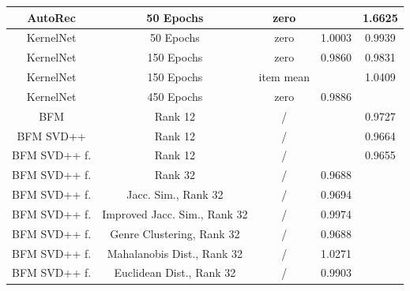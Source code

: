 \documentclass[10pt,conference,compsocconf]{IEEEtran}
\begin{document}
\begin{table}[h]
\begin{tabular}{|| c | c | c | c | c ||}
            AutoRec              & 50 Epochs                             & zero                    &                        & 1.6625                  \\
            \hline
            KernelNet            & 50 Epochs                             & zero                    & 1.0003                 & 0.9939                  \\
            KernelNet            & 150 Epochs                            & zero                    & 0.9860                 & 0.9831                  \\
            KernelNet            & 150 Epochs                            & item mean               &                        & 1.0409                  \\
            KernelNet            & 450 Epochs                            & zero                    & 0.9886                 &                         \\
            \hline
            BFM                  & Rank 12                               & /                       &                        & 0.9727                  \\
            BFM SVD++            & Rank 12                               & /                       &                        & 0.9664                  \\
            BFM SVD++ f.         & Rank 12                               & /                       &                        & 0.9655                  \\
            BFM SVD++ f.         & Rank 32                               & /                       & 0.9688                 &                         \\
            BFM SVD++ f.         & Jacc. Sim., Rank 32                    & /                       & 0.9694                 &                         \\
            BFM SVD++ f.         & Improved Jacc. Sim., Rank 32          & /                       & 0.9974                 &                         \\
            BFM SVD++ f.         & Genre Clustering, Rank 32             & /                       & 0.9688                 &                         \\
            BFM SVD++ f.         & Mahalanobis Dist., Rank 32            & /                       & 1.0271                 &                         \\
            BFM SVD++ f.         & Euclidean Dist., Rank 32              & /                       & 0.9903                 &                         \\

\end{tabular}
\end{table}
\end{document}
